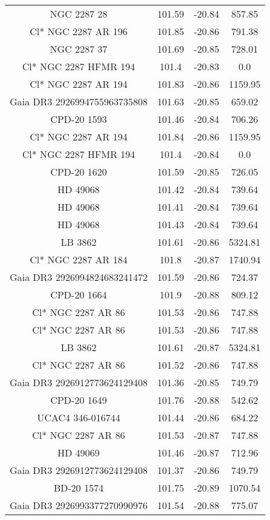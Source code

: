 \begin{table}
\begin{tabular}{cccc}
NGC  2287    28 & 101.59 & -20.84 & 857.85 \\
Cl* NGC 2287     AR     196 & 101.85 & -20.86 & 791.38 \\
NGC  2287    37 & 101.69 & -20.85 & 728.01 \\
Cl* NGC 2287   HFMR     194 & 101.4 & -20.83 & 0.0 \\
Cl* NGC 2287     AR     194 & 101.83 & -20.86 & 1159.95 \\
Gaia DR3 2926994755963735808 & 101.63 & -20.85 & 659.02 \\
CPD-20  1593 & 101.46 & -20.84 & 706.26 \\
Cl* NGC 2287     AR     194 & 101.84 & -20.86 & 1159.95 \\
Cl* NGC 2287   HFMR     194 & 101.4 & -20.84 & 0.0 \\
CPD-20  1620 & 101.59 & -20.85 & 726.05 \\
HD  49068 & 101.42 & -20.84 & 739.64 \\
HD  49068 & 101.41 & -20.84 & 739.64 \\
HD  49068 & 101.43 & -20.84 & 739.64 \\
LB  3862 & 101.61 & -20.86 & 5324.81 \\
Cl* NGC 2287     AR     184 & 101.8 & -20.87 & 1740.94 \\
Gaia DR3 2926994824683241472 & 101.59 & -20.86 & 724.37 \\
CPD-20  1664 & 101.9 & -20.88 & 809.12 \\
Cl* NGC 2287     AR      86 & 101.53 & -20.86 & 747.88 \\
Cl* NGC 2287     AR      86 & 101.53 & -20.86 & 747.88 \\
LB  3862 & 101.61 & -20.87 & 5324.81 \\
Cl* NGC 2287     AR      86 & 101.52 & -20.86 & 747.88 \\
Gaia DR3 2926912773624129408 & 101.36 & -20.85 & 749.79 \\
CPD-20  1649 & 101.76 & -20.88 & 542.62 \\
UCAC4 346-016744 & 101.44 & -20.86 & 684.22 \\
Cl* NGC 2287     AR      86 & 101.53 & -20.87 & 747.88 \\
HD  49069 & 101.46 & -20.87 & 712.96 \\
Gaia DR3 2926912773624129408 & 101.37 & -20.86 & 749.79 \\
BD-20  1574 & 101.75 & -20.89 & 1070.54 \\
Gaia DR3 2926993377270990976 & 101.54 & -20.88 & 775.07 \\

\end{tabular}
\end{table}
